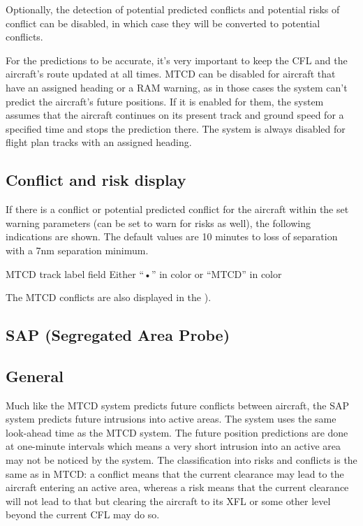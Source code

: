 \documentclass[11pt,a4paper]{memoir}
\newcommand{\colorref}[1]{\textit{\hyperref[#1]{\StrDel{#1}{color:}}}}
\begin{document}
Optionally, the detection of potential predicted conflicts and potential risks of conflict can be disabled, in which case they will be converted to potential conflicts.

For the predictions to be accurate, it’s very important to keep the CFL and the aircraft’s route updated at all times. MTCD can be disabled for aircraft that have an assigned heading or a RAM warning, as in those cases the system can’t predict the aircraft’s future positions. If it is enabled for them, the system assumes that the aircraft continues on its present track and ground speed for a specified time and stops the prediction there. The system is always disabled for flight plan tracks with an assigned heading.

\subsection*{Conflict and risk display}

If there is a conflict or potential predicted conflict for the aircraft within the set warning parameters (can be set to warn for risks as well), the following indications are shown. The default values are 10 minutes to loss of separation with a 7nm separation minimum.

MTCD track label field Either “•” in \colorref{color:Urgency} color or “MTCD” in \colorref{color:Warning} color

The MTCD conflicts are also displayed in the \textit{}).

\subsection{SAP (Segregated Area Probe)}

\subsection*{General}

Much like the MTCD system predicts future conflicts between aircraft, the SAP system predicts future intrusions into active areas. The system uses the same look-ahead time as the MTCD system. The future position predictions are done at one-minute intervals which means a very short intrusion into an active area may not be noticed by the system. The classification into risks and conflicts is the same as in MTCD: a conflict means that the current clearance may lead to the aircraft entering an active area, whereas a risk means that the current clearance will not lead to that but clearing the aircraft to its XFL or some other level beyond the current CFL may do so.
\end{document}
